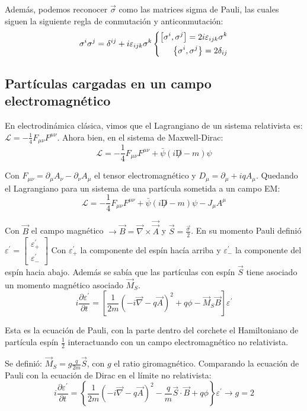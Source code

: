 Además, podemos reconocer $\vec{\sigma}$ como las matrices sigma de Pauli, las cuales siguen la siguiente regla de conmutación y anticonmutación:
\[\sigma^{i}\sigma^{j}=\delta^{ij}+i\varepsilon_{ijk}\sigma^{k}\left\{\begin{align}
  \comm{\sigma^{i}}{\sigma^{j}}=2i\varepsilon_{ijk}\sigma^{k} \\
  \acomm{\sigma^{i}}{\sigma^{j}}=2\delta_{ij} 
\end{align}\right.\]
\subsection{Partículas cargadas en un campo electromagnético}
En electrodinámica clásica, vimos que el Lagrangiano de un sistema relativista es: $\mathcal{L}=-\frac{1}{4} F_{\mu \nu} F^{\mu \nu}$. Ahora bien, en el sistema de Maxwell-Dirac:
$$
\mathcal{L}=-\frac{1}{4} F_{\mu \nu} F^{\mu \nu}+\bar{\psi}(i \not D-m) \psi
$$

Con $F_{\mu \nu}=\partial_{\mu} A_{\nu}-\partial_{\nu} A_{\mu}$ el tensor electromagnético y $D_{\mu}=\partial_{\mu}+i q A_{\mu}$. Quedando el Lagrangiano para un sistema de una partícula sometida a un campo EM:
$$
\mathcal{L}=-\frac{1}{4} F_{\mu \nu} F^{\mu \nu}+\bar{\psi}(i \not D-m) \psi-J_{\mu} A^{\mu}
$$

Con $\vec{B}$ el campo magnético $\rightarrow \vec{B}=\vec{\nabla} \times \overrightarrow{\vec{A}}$ y $\vec{S}=\frac{\vec{\sigma}}{2}$.
En su momento Pauli definió $\varepsilon^{\prime}=\left[\begin{array}{l}\varepsilon_{+}^{\prime} \\ \varepsilon_{-}^{\prime}\end{array}\right]$
Con $\varepsilon_{+}^{\prime}$ la componente del espín hacía arriba y $\varepsilon_{-}^{\prime}$ la componente del espín hacia abajo. Además se sabía que las partículas con espín $\vec{S}$ tiene asociado un momento magnético asociado $\vec{M}_{S}$.
$$
\begin{equation*}
i \frac{\partial \varepsilon^{\prime}}{\partial t}=\left[\frac{1}{2 m}(-i \vec{\nabla}-q \vec{A})^{2}+q \phi-\vec{M}_{S} \vec{B}\right] \varepsilon^{\prime} \tag{1.15}
\end{equation*}
$$

Esta es la ecuación de Pauli, con la parte dentro del corchete el Hamiltoniano de partícula espín $\frac{1}{2}$ interactuando con un campo electromagnético no relativista.

Se definió: $\vec{M}_{S}=g \frac{q}{2 m} \vec{S}$, con $g$ el ratio giromagnético.
Comparando la ecuación de Pauli con la ecuación de Dirac en el límite no relativista:
$$
i \frac{\partial \varepsilon^{\prime}}{\partial t}=\left\{\frac{1}{2 m}(-i \vec{\nabla}-q \vec{A})^{2}-\frac{q}{m} \vec{S} \cdot \vec{B}+q \phi\right\} \varepsilon^{\prime} \rightarrow g=2
$$

